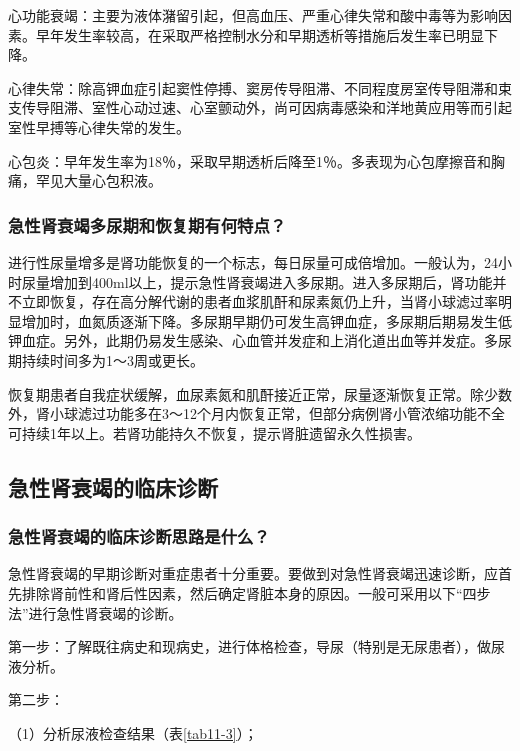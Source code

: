 心功能衰竭：主要为液体潴留引起，但高血压、严重心律失常和酸中毒等为影响因素。早年发生率较高，在采取严格控制水分和早期透析等措施后发生率已明显下降。

心律失常：除高钾血症引起窦性停搏、窦房传导阻滞、不同程度房室传导阻滞和束支传导阻滞、室性心动过速、心室颤动外，尚可因病毒感染和洋地黄应用等而引起室性早搏等心律失常的发生。

心包炎：早年发生率为18％，采取早期透析后降至1％。多表现为心包摩擦音和胸痛，罕见大量心包积液。

\subsubsection{急性肾衰竭多尿期和恢复期有何特点？}

进行性尿量增多是肾功能恢复的一个标志，每日尿量可成倍增加。一般认为，24小时尿量增加到400ml以上，提示急性肾衰竭进入多尿期。进入多尿期后，肾功能并不立即恢复，存在高分解代谢的患者血浆肌酐和尿素氮仍上升，当肾小球滤过率明显增加时，血氮质逐渐下降。多尿期早期仍可发生高钾血症，多尿期后期易发生低钾血症。另外，此期仍易发生感染、心血管并发症和上消化道出血等并发症。多尿期持续时间多为1～3周或更长。

恢复期患者自我症状缓解，血尿素氮和肌酐接近正常，尿量逐渐恢复正常。除少数外，肾小球滤过功能多在3～12个月内恢复正常，但部分病例肾小管浓缩功能不全可持续1年以上。若肾功能持久不恢复，提示肾脏遗留永久性损害。

\subsection{急性肾衰竭的临床诊断}

\subsubsection{急性肾衰竭的临床诊断思路是什么？}

急性肾衰竭的早期诊断对重症患者十分重要。要做到对急性肾衰竭迅速诊断，应首先排除肾前性和肾后性因素，然后确定肾脏本身的原因。一般可采用以下“四步法”进行急性肾衰竭的诊断。

第一步：了解既往病史和现病史，进行体格检查，导尿（特别是无尿患者），做尿液分析。

第二步：

（1）分析尿液检查结果（表\ref{tab11-3}）；

